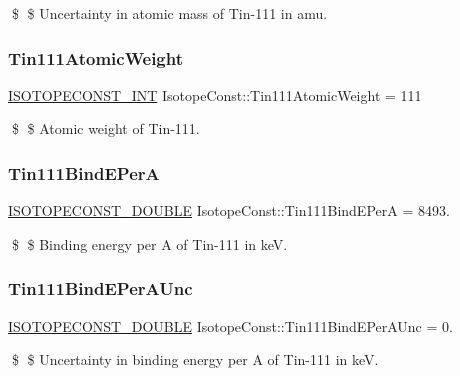 \$ \$ Uncertainty in atomic mass of Tin-\/111 in amu. \mbox{\label{group___isotope_const-_tin-_sn111_ga9416cbdecc652ba23fcefb515c872b38}} 
\subsubsection{\texorpdfstring{Tin111\+Atomic\+Weight}{Tin111AtomicWeight}}
{\footnotesize\ttfamily \mbox{\hyperlink{group___isotope_const-_macros_ga5f18360b3e99483a35c32d789e62621c}{I\+S\+O\+T\+O\+P\+E\+C\+O\+N\+S\+T\+\_\+\+I\+NT}} Isotope\+Const\+::\+Tin111\+Atomic\+Weight = 111}

\$ \$ Atomic weight of Tin-\/111. \mbox{\label{group___isotope_const-_tin-_sn111_ga835930bf7cd8ae9af00fcdd76391db35}} 
\subsubsection{\texorpdfstring{Tin111\+Bind\+E\+PerA}{Tin111BindEPerA}}
{\footnotesize\ttfamily \mbox{\hyperlink{group___isotope_const-_macros_ga8f45a7272ce02c0b4c65c44636ed719a}{I\+S\+O\+T\+O\+P\+E\+C\+O\+N\+S\+T\+\_\+\+D\+O\+U\+B\+LE}} Isotope\+Const\+::\+Tin111\+Bind\+E\+PerA = 8493.}

\$ \$ Binding energy per A of Tin-\/111 in keV. \mbox{\label{group___isotope_const-_tin-_sn111_ga608fa50d9d37238c0ad8a738178de3d4}} 
\subsubsection{\texorpdfstring{Tin111\+Bind\+E\+Per\+A\+Unc}{Tin111BindEPerAUnc}}
{\footnotesize\ttfamily \mbox{\hyperlink{group___isotope_const-_macros_ga8f45a7272ce02c0b4c65c44636ed719a}{I\+S\+O\+T\+O\+P\+E\+C\+O\+N\+S\+T\+\_\+\+D\+O\+U\+B\+LE}} Isotope\+Const\+::\+Tin111\+Bind\+E\+Per\+A\+Unc = 0.}

\$ \$ Uncertainty in binding energy per A of Tin-\/111 in keV. \mbox{\label{group___isotope_const-_tin-_sn111_gae317dfcb5d917644ebd339b86a1a8a5f}} 
